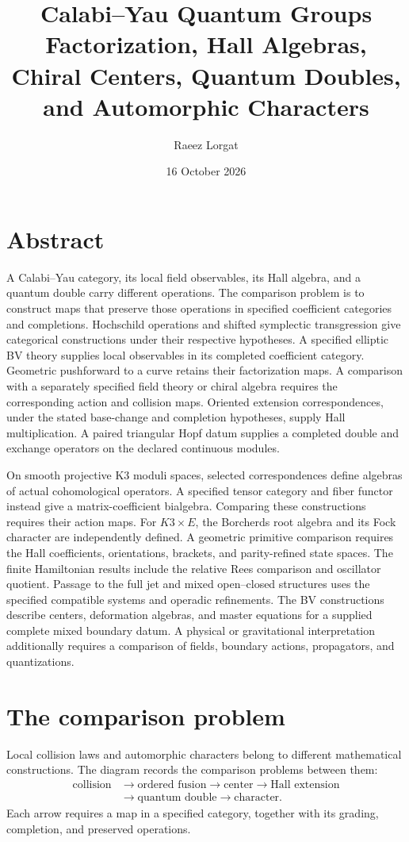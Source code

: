 \documentclass[11pt,twoside,openright]{memoir}
\title{\texorpdfstring{\textbf{Calabi--Yau Quantum Groups}\\[0.55em]\Large Factorization, Hall Algebras, Chiral Centers, Quantum Doubles, and Automorphic Characters}{Calabi--Yau Quantum Groups: Factorization, Hall Algebras, Chiral Centers, Quantum Doubles, and Automorphic Characters}}
\author{Raeez Lorgat}
\date{16 October 2026}
\begin{document}
\frontmatter
\maketitle
\thispagestyle{empty}
\cleardoublepage
\chapter*{Abstract}

A Calabi--Yau category, its local field observables, its Hall algebra, and a quantum double carry different operations. The comparison problem is to construct maps that preserve those operations in specified coefficient categories and completions. Hochschild operations and shifted symplectic transgression give categorical constructions under their respective hypotheses. A specified elliptic BV theory supplies local observables in its completed coefficient category. Geometric pushforward to a curve retains their factorization maps. A comparison with a separately specified field theory or chiral algebra requires the corresponding action and collision maps. Oriented extension correspondences, under the stated base-change and completion hypotheses, supply Hall multiplication. A paired triangular Hopf datum supplies a completed double and exchange operators on the declared continuous modules.

On smooth projective K3 moduli spaces, selected correspondences define algebras of actual cohomological operators. A specified tensor category and fiber functor instead give a matrix-coefficient bialgebra. Comparing these constructions requires their action maps. For $K3\times E$, the Borcherds root algebra and its Fock character are independently defined. A geometric primitive comparison requires the Hall coefficients, orientations, brackets, and parity-refined state spaces. The finite Hamiltonian results include the relative Rees comparison and oscillator quotient. Passage to the full jet and mixed open--closed structures uses the specified compatible systems and operadic refinements. The BV constructions describe centers, deformation algebras, and master equations for a supplied complete mixed boundary datum. A physical or gravitational interpretation additionally requires a comparison of fields, boundary actions, propagators, and quantizations.

\chapter*{The comparison problem}
Local collision laws and automorphic characters belong to different mathematical constructions. The diagram records the comparison problems between them:
\[
\begin{aligned}
\text{collision}&\longrightarrow\text{ordered fusion}\longrightarrow\text{center}\longrightarrow\text{Hall extension}\\
&\longrightarrow\text{quantum double}\longrightarrow\text{character}.
\end{aligned}
\]
Each arrow requires a map in a specified category, together with its grading, completion, and preserved operations.
\end{document}
